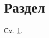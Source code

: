 \documentclass{article}
\begin{document}
\section{Раздел}\label{sec:one}См. \ref{sec:one}.
\end{document}
